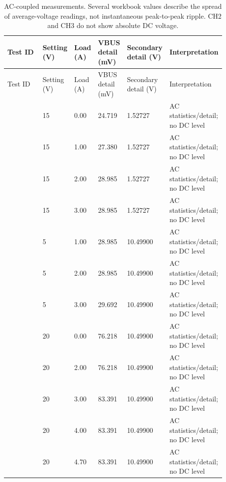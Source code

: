 \begingroup
\scriptsize
\setlength{\tabcolsep}{3pt}
\renewcommand{\arraystretch}{1.12}
\begin{longtable}{@{}L{0.2872\linewidth} L{0.0741\linewidth} L{0.0741\linewidth} L{0.1297\linewidth} L{0.1297\linewidth} L{0.1853\linewidth}@{}}
\caption{AC-coupled measurements. Several workbook values describe the spread of average-voltage readings, not instantaneous peak-to-peak ripple. CH2 and CH3 do not show absolute DC voltage.}\label{tab:ac-coupled-ripple-captures}\\
\toprule
Test ID & Setting (V) & Load (A) & VBUS detail (mV) & Secondary detail (V) & Interpretation\\
\midrule
\endfirsthead
\toprule
Test ID & Setting (V) & Load (A) & VBUS detail (mV) & Secondary detail (V) & Interpretation\\
\midrule
\endhead
{} & 15 & 0.00 & 24.719 & 1.52727 & AC statistics/detail; no DC level\\
 & 15 & 1.00 & 27.380 & 1.52727 & AC statistics/detail; no DC level\\
 & 15 & 2.00 & 28.985 & 1.52727 & AC statistics/detail; no DC level\\
 & 15 & 3.00 & 28.985 & 1.52727 & AC statistics/detail; no DC level\\
 & 5 & 1.00 & 28.985 & 10.49900 & AC statistics/detail; no DC level\\
 & 5 & 2.00 & 28.985 & 10.49900 & AC statistics/detail; no DC level\\
 & 5 & 3.00 & 29.692 & 10.49900 & AC statistics/detail; no DC level\\
 & 20 & 0.00 & 76.218 & 10.49900 & AC statistics/detail; no DC level\\
 & 20 & 2.00 & 76.218 & 10.49900 & AC statistics/detail; no DC level\\
 & 20 & 3.00 & 83.391 & 10.49900 & AC statistics/detail; no DC level\\
 & 20 & 4.00 & 83.391 & 10.49900 & AC statistics/detail; no DC level\\
 & 20 & 4.70 & 83.391 & 10.49900 & AC statistics/detail; no DC level\\
\bottomrule
\end{longtable}
\endgroup
